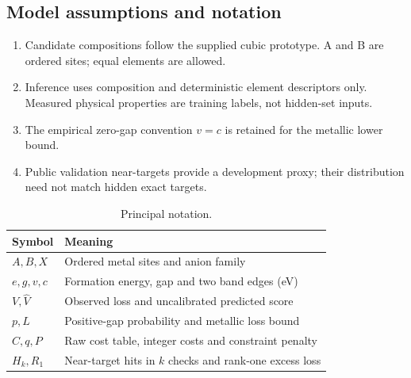 \subsection{Model assumptions and notation}
\begin{enumerate}
\item Candidate compositions follow the supplied cubic prototype. A and B are ordered sites; equal elements are allowed.
\item Inference uses composition and deterministic element descriptors only. Measured physical properties are training labels, not hidden-set inputs.
\item The empirical zero-gap convention $v=c$ is retained for the metallic lower bound.
\item Public validation near-targets provide a development proxy; their distribution need not match hidden exact targets.
\end{enumerate}
\begin{table}[htbp]\centering\small\caption{Principal notation.}\begin{tabular}{ll}\toprule Symbol & Meaning\\\midrule
$A,B,X$ & Ordered metal sites and anion family\\
$e,g,v,c$ & Formation energy, gap and two band edges (eV)\\
$V,\widehat V$ & Observed loss and uncalibrated predicted score\\
$p,L$ & Positive-gap probability and metallic loss bound\\
$C,q,P$ & Raw cost table, integer costs and constraint penalty\\
$H_k,R_1$ & Near-target hits in $k$ checks and rank-one excess loss\\\bottomrule\end{tabular}\end{table}
